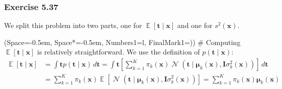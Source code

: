 \documentclass[12pt, a4paper]{article}
\newcommand{\listSpace}{-0.5em}%
\newcommand{\vect}[1]{\bm{#1}}
\DeclareMathOperator{\N}{\mathcal{N}}
\DeclareMathOperator{\E}{\mathbb{E}}
\begin{document}
\subsubsection*{Exercise 5.37}
We split this problem into two parts, one for $\E \left[ \vect{t} \mid \vect{x} \right]$ and one for $s^2 (\vect{x})$.
\begin{easylist}[enumerate]
	\ListProperties(Space=\listSpace, Space*=\listSpace, Numbers1=l, FinalMark1={)})
	# Computing $\E \left[ \vect{t} \mid \vect{x} \right]$ is relatively straightforward. 
	We use the definition of $p (\vect{t} \mid \vect{x})$:
	\begin{align*}
	\E \left[ \vect{t} \mid \vect{x} \right] &= 
	\int \vect{t} p (\vect{t} \mid \vect{x}) \, d\vect{t} = 
	\int \vect{t} \left[ 
	\sum_{k=1}^{K} \pi_k (\vect{x}) 
	\N \left( \vect{t} \mid \vect{\mu}_k (\vect{x}) , \vect{I} \sigma_k^2(\vect{x}) \right)
	 \right] \, d\vect{t} \\
	 &= \sum_{k=1}^{K} \pi_k (\vect{x})  \E \left[ \N \left( \vect{t} \mid \vect{\mu}_k (\vect{x}) , \vect{I} \sigma_k^2(\vect{x}) \right)  \right]
	 = \sum_{k=1}^{K} \pi_k (\vect{x}) \vect{\mu}_k (\vect{x})
	\end{align*}
	

\end{easylist}
\end{document}
